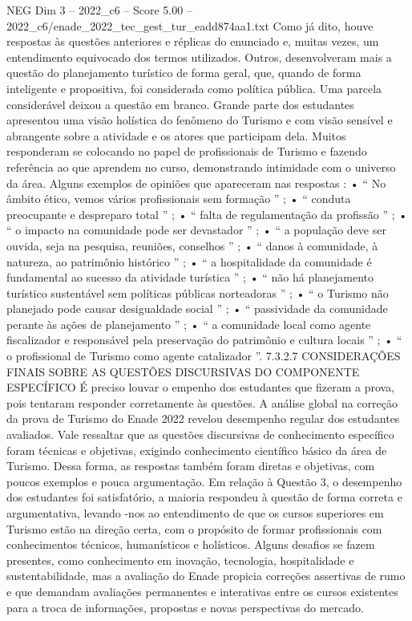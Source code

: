\begin{textsample}{NEG Dim 3 – 2022\_c6 – Score 5.00 – 2022\_c6/enade\_2022\_tec\_gest\_tur\_eadd874aa1.txt}
Como já dito, houve respostas às questões anteriores e réplicas do enunciado e, muitas vezes, um entendimento equivocado dos termos utilizados.
Outros, desenvolveram mais a questão do planejamento turístico de forma geral, que, quando de forma inteligente e propositiva, foi considerada como política pública.
Uma parcela considerável deixou a questão em branco.
Grande parte dos estudantes apresentou uma visão holística do fenômeno do Turismo e com visão sensível e abrangente sobre a atividade e os atores que participam dela.
Muitos responderam se colocando no papel de profissionais de Turismo e fazendo referência ao que aprendem no curso, demonstrando intimidade com o universo da área.
Alguns exemplos de opiniões que apareceram nas respostas : • “ No âmbito ético, vemos vários profissionais sem formação ” ; • “ conduta preocupante e despreparo total ” ; • “ falta de regulamentação da profissão ” ; • “ o impacto na comunidade pode ser devastador ” ; • “ a população deve ser ouvida, seja na pesquisa, reuniões, conselhos ” ; • “ danos à comunidade, à natureza, ao patrimônio histórico ” ; • “ a hospitalidade da comunidade é fundamental ao sucesso da atividade turística ” ; • “ não há planejamento turístico sustentável sem políticas públicas norteadoras ” ; • “ o Turismo não planejado pode causar desigualdade social ” ; • “ passividade da comunidade perante às ações de planejamento ” ; • “ a comunidade local como agente fiscalizador e responsável pela preservação do patrimônio e cultura locais ” ; • “ o profissional de Turismo como agente catalizador ”. 7.3.2.7 CONSIDERAÇÕES FINAIS SOBRE AS QUESTÕES DISCURSIVAS DO COMPONENTE ESPECÍFICO É preciso louvar o empenho dos estudantes que fizeram a prova, pois tentaram responder corretamente às questões.
A análise global na correção da prova de Turismo do Enade 2022 revelou desempenho regular dos estudantes avaliados.
Vale ressaltar que as questões discursivas de conhecimento específico foram técnicas e objetivas, exigindo conhecimento científico básico da área de Turismo.
Dessa forma, as respostas também foram diretas e objetivas, com poucos exemplos e pouca argumentação.
Em relação à Questão 3, o desempenho dos estudantes foi satisfatório, a maioria respondeu à questão de forma correta e argumentativa, levando -nos ao entendimento de que os cursos superiores em Turismo estão na direção certa, com o propósito de formar profissionais com conhecimentos técnicos, humanísticos e holísticos.
Alguns desafios se fazem presentes, como conhecimento em inovação, tecnologia, hospitalidade e sustentabilidade, mas a avaliação do Enade propicia correções assertivas de rumo e que demandam avaliações permanentes e interativas entre os cursos existentes para a troca de informações, propostas e novas perspectivas do mercado.

\end{textsample}
